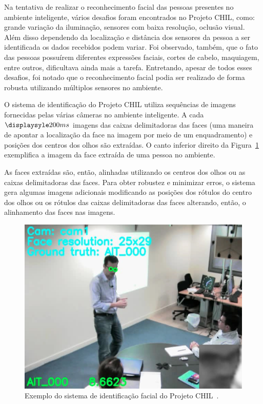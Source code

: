 Na tentativa de realizar o reconhecimento facial das pessoas presentes no ambiente inteligente, vários desafios foram encontrados no Projeto CHIL, como: grande variação da iluminação, sensores com baixa resolução, oclusão visual. Além disso dependendo da localização e distância dos sensores da pessoa a ser identificada os dados recebidos podem variar. Foi observado, também, que o fato das pessoas possuírem diferentes expressões faciais, cortes de cabelo, maquiagem, entre outros, dificultava ainda mais a tarefa. Entretando, apesar de todos esses desafios, foi notado que o reconhecimento facial podia ser realizado de forma robusta utilizando múltiplos sensores no ambiente.

O sistema de identificação do Projeto CHIL utiliza sequências de imagens fornecidas pelas várias câmeras no ambiente inteligente. A cada $\displaysyle 200ms$ imagens das caixas delimitadoras das faces (uma maneira de apontar a localização da face na imagem por meio de um enquadramento) e posições dos centros dos olhos são extraídas. O canto inferior direito da Figura~\ref{chil} exemplifica a imagem da face extraída de uma pessoa no ambiente.

As faces extraídas são, então, alinhadas utilizando os centros dos olhos ou as caixas delimitadoras das faces. Para obter robustez e minimizar erros, o sistema gera algumas imagens adicionais modificando as posições dos rótulos do centro dos olhos ou os rótulos das caixas delimitadoras das faces alterando, então, o alinhamento das faces nas imagens.

	\begin{figure}[hbt]
		\begin{center}
			\includegraphics[scale=0.4]{figuras/3.TrabalhosCorrelatos/chil.png}
		\end{center}
		\caption{Exemplo do sistema de identificação facial do Projeto CHIL~\cite{chil}.}
		\label{chil}
	\end{figure}


